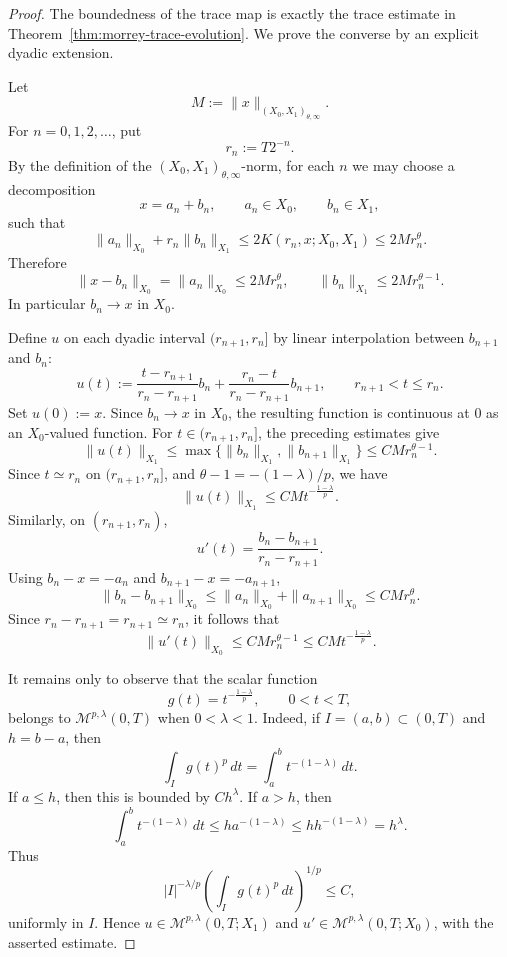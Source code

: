 \documentclass[smallextended,envcountsect,envcountsame]{svjour3}
\begin{document}
	\begin{proof}
	The boundedness of the trace map is exactly the trace estimate in Theorem~\ref{thm:morrey-trace-evolution}.  We prove the converse by an explicit dyadic extension.

	Let
	\[
	M:=\|x\|_{(X_0,X_1)_{\theta,\infty}}.
	\]
	For \(n=0,1,2,\ldots\), put
	\[
	r_n:=T2^{-n}.
	\]
	By the definition of the \((X_0,X_1)_{\theta,\infty}\)-norm, for each \(n\) we may choose a decomposition
	\[
	x=a_n+b_n,
	\qquad a_n\in X_0,
	\qquad b_n\in X_1,
	\]
	such that
	\[
	\|a_n\|_{X_0}+r_n\|b_n\|_{X_1}
	\le
	2K(r_n,x;X_0,X_1)
	\le
	2Mr_n^\theta.
	\]
	Therefore
	\[
	\|x-b_n\|_{X_0}=\|a_n\|_{X_0}\le 2Mr_n^\theta,
	\qquad
	\|b_n\|_{X_1}\le 2Mr_n^{\theta-1}.
	\]
	In particular \(b_n\to x\) in \(X_0\).

	Define \(u\) on each dyadic interval \((r_{n+1},r_n]\) by linear interpolation between \(b_{n+1}\) and \(b_n\):
	\[
	u(t):=
	\frac{t-r_{n+1}}{r_n-r_{n+1}}b_n
	+
	\frac{r_n-t}{r_n-r_{n+1}}b_{n+1},
	\qquad r_{n+1}<t\le r_n.
	\]
	Set \(u(0):=x\).  Since \(b_n\to x\) in \(X_0\), the resulting function is continuous at \(0\) as an \(X_0\)-valued function.  For \(t\in(r_{n+1},r_n]\), the preceding estimates give
	\[
	\|u(t)\|_{X_1}
	\le
	\max\{\|b_n\|_{X_1},\|b_{n+1}\|_{X_1}\}
	\le
	C M r_n^{\theta-1}.
	\]
	Since \(t\simeq r_n\) on \((r_{n+1},r_n]\), and \(\theta-1=-(1-\lambda)/p\), we have
	\[
	\|u(t)\|_{X_1}
	\le
	C M t^{-\frac{1-\lambda}{p}}.
	\]
	Similarly, on \((r_{n+1},r_n)\),
	\[
	u'(t)=\frac{b_n-b_{n+1}}{r_n-r_{n+1}}.
	\]
	Using \(b_n-x=-a_n\) and \(b_{n+1}-x=-a_{n+1}\),
	\[
	\|b_n-b_{n+1}\|_{X_0}
	\le
	\|a_n\|_{X_0}+\|a_{n+1}\|_{X_0}
	\le
	C M r_n^\theta.
	\]
	Since \(r_n-r_{n+1}=r_{n+1}\simeq r_n\), it follows that
	\[
	\|u'(t)\|_{X_0}
	\le
	C M r_n^{\theta-1}
	\le
	C M t^{-\frac{1-\lambda}{p}}.
	\]

	It remains only to observe that the scalar function
	\[
	g(t)=t^{-\frac{1-\lambda}{p}},\qquad 0<t<T,
	\]
	belongs to \(\mathcal M^{p,\lambda}(0,T)\) when \(0<\lambda<1\).  Indeed, if \(I=(a,b)\subset(0,T)\) and \(h=b-a\), then
	\[
	\int_I g(t)^p\,dt=\int_a^b t^{-(1-\lambda)}\,dt.
	\]
	If \(a\le h\), then this is bounded by \(C h^\lambda\).  If \(a>h\), then
	\[
	\int_a^b t^{-(1-\lambda)}\,dt
	\le
	h a^{-(1-\lambda)}
	\le
	h h^{-(1-\lambda)}=h^\lambda.
	\]
	Thus
	\[
	|I|^{-\lambda/p}
	\left(\int_I g(t)^p\,dt\right)^{1/p}
	\le C,
	\]
	uniformly in \(I\).  Hence \(u\in\mathcal M^{p,\lambda}(0,T;X_1)\) and \(u'\in\mathcal M^{p,\lambda}(0,T;X_0)\), with the asserted estimate.
	\end{proof}
\end{document}
